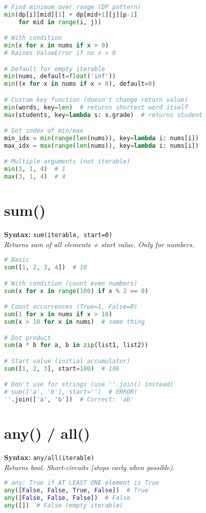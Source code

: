 \documentclass[8pt,landscape]{article}
\begin{document}
\begin{multicols}{3}
\begin{lstlisting}[language=Python]
# Find minimum over range (DP pattern)
min(dp[i][mid][1] + dp[mid+1][j][p-1]
    for mid in range(i, j))

# With condition
min(x for x in nums if x > 0)
# Raises ValueError if no x > 0

# Default for empty iterable
min(nums, default=float('inf'))
min((x for x in nums if x > 0), default=0)

# Custom key function (doesn't change return value)
min(words, key=len)  # returns shortest word itself
max(students, key=lambda s: s.grade)  # returns student

# Get index of min/max
min_idx = min(range(len(nums)), key=lambda i: nums[i])
max_idx = max(range(len(nums)), key=lambda i: nums[i])

# Multiple arguments (not iterable)
min(3, 1, 4)  # 1
max(3, 1, 4)  # 4
\end{lstlisting}

\section*{sum()}
\textbf{Syntax:} \lstinline|sum(iterable, start=0)| \\
\textit{Returns sum of all elements + start value. Only for numbers.}

\begin{lstlisting}[language=Python]
# Basic
sum([1, 2, 3, 4])  # 10

# With condition (count even numbers)
sum(x for x in range(100) if x % 2 == 0)

# Count occurrences (True=1, False=0)
sum(1 for x in nums if x > 10)
sum(x > 10 for x in nums)  # same thing

# Dot product
sum(a * b for a, b in zip(list1, list2))

# Start value (initial accumulator)
sum([1, 2, 3], start=100)  # 106

# Don't use for strings (use ''.join() instead)
# sum(['a', 'b'], start='')  # ERROR!
''.join(['a', 'b'])  # Correct: 'ab'
\end{lstlisting}

\section*{any() / all()}
\textbf{Syntax:} \lstinline|any/all(iterable)| \\
\textit{Returns bool. Short-circuits (stops early when possible).}

\begin{lstlisting}[language=Python]
# any: True if AT LEAST ONE element is True
any([False, False, True, False])  # True
any([False, False, False])  # False
any([])  # False (empty iterable)


\end{lstlisting}
\end{multicols}
\end{document}
